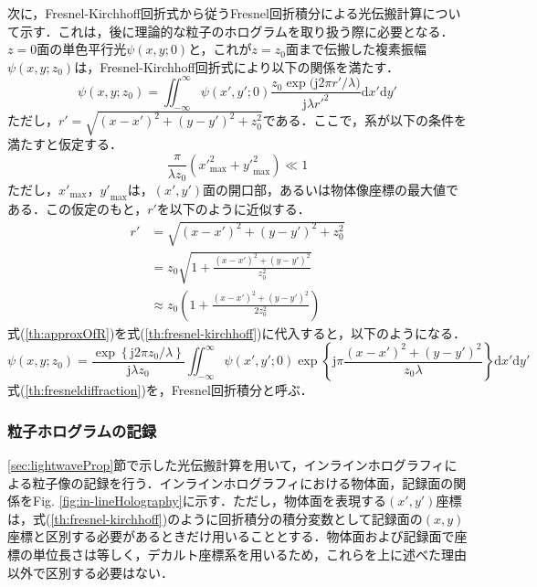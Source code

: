 次に，Fresnel-Kirchhoff回折式から従うFresnel回折積分による光伝搬計算について示す．これは，後に理論的な粒子のホログラムを取り扱う際に必要となる．$z=0$面の単色平行光$\psi(x,y;0)$と，これが$z = z_0$面まで伝搬した複素振幅$\psi(x,y;z_0)$は，Fresnel-Kirchhoff回折式により以下の関係を満たす\cite{kreis}．
\begin{equation}
    \label{th:fresnel-kirchhoff}
    \psi(x,y;z_0) = \iint_{-\infty}^{\infty} \psi(x',y';0)\frac{z_0\exp{(\mathrm{j}2\pi r' /\lambda})}{\mathrm{j}\lambda r'^2} \mathrm{d}x'\mathrm{d}y'
\end{equation}
ただし，$r'=\sqrt{(x-x')^2+(y-y')^2+z_0^2}$である．ここで，系が以下の条件を満たすと仮定する．
\begin{equation}
    \label{th:fraunhoferCondition}
    \frac{\pi }{\lambda z_0} \left( {x'}_{\mathrm{max}}^2 + {y'}_{\mathrm{max}}^2 \right) \ll 1
\end{equation}
ただし，${x'}_{\mathrm{max}}$，${y'}_{\mathrm{max}}$は，$(x',y')$面の開口部，あるいは物体像座標の最大値である．この仮定のもと，$r'$を以下のように近似する．
\begin{align}
    r' &= \sqrt{(x-x')^2+(y-y')^2+z_0^2} \\
    &= z_0 \sqrt{1 + \frac{(x-x')^2+(y-y')^2}{z_0^2}} \\
    \label{th:approxOfR}
    &\approx z_0 \left( 1 + \frac{(x-x')^2+(y-y')^2}{2z_0^2} \right)
\end{align}
式(\ref{th:approxOfR})を式(\ref{th:fresnel-kirchhoff})に代入すると，以下のようになる\cite{tyler1976}．
\begin{equation}
    \label{th:fresneldiffraction}
    \psi(x,y;z_0) = \frac{\exp{ \left\{\mathrm{j}2\pi z_0 /\lambda \right\}}}{\mathrm{j}\lambda z_0} \iint_{-\infty}^{\infty} \psi(x',y';0)\exp{\left\{ \mathrm{j}\pi \frac{(x-x')^2+(y-y')^2}{z_0\lambda} \right\}} \mathrm{d}x'\mathrm{d}y'
\end{equation}
式(\ref{th:fresneldiffraction})を，Fresnel回折積分と呼ぶ．

\subsubsection{粒子ホログラムの記録}
\ref{sec:lightwaveProp}節で示した光伝搬計算を用いて，インラインホログラフィによる粒子像の記録を行う．インラインホログラフィにおける物体面，記録面の関係をFig. \ref{fig:in-lineHolography}に示す．ただし，物体面を表現する$(x',y')$座標は，式(\ref{th:fresnel-kirchhoff})のように回折積分の積分変数として記録面の$(x,y)$座標と区別する必要があるときだけ用いることとする．物体面および記録面で座標の単位長さは等しく，デカルト座標系を用いるため，これらを上に述べた理由以外で区別する必要はない．

